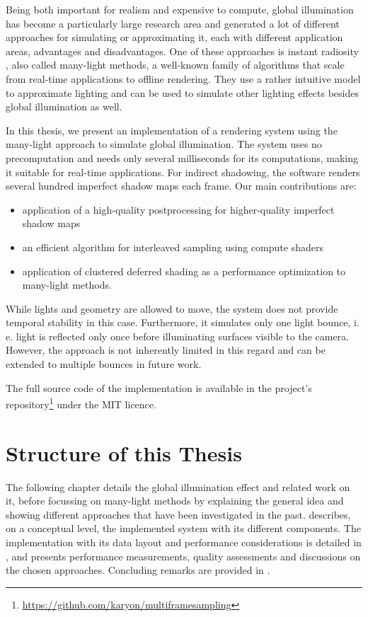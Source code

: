 Being both important for realism and expensive to compute, global illumination has become a particularly large research area and generated a lot of different approaches for simulating or approximating it, each with different application areas, advantages and disadvantages. One of these approaches is instant radiosity \citep{Keller:1997:InstantRadiosity}, also called many-light methods, a well-known family of algorithms that scale from real-time applications to offline rendering. They use a rather intuitive model to approximate lighting and can be used to simulate other lighting effects besides global illumination as well.

In this thesis, we present an implementation of a rendering system using the many-light approach to simulate global illumination. The system uses no precomputation and needs only several milliseconds for its computations, making it suitable for real-time applications. For indirect shadowing, the software renders several hundred imperfect shadow maps \citep{ritschel2008ism} each frame. Our main contributions are:
\begin{itemize}
    \item application of a high-quality postprocessing for higher-quality imperfect shadow maps
    \item an efficient algorithm for interleaved sampling \citep{Keller:2001:InterleavedSampling} using compute shaders
    \item application of clustered deferred shading \citep{olsson2012clustered} as a performance optimization to many-light methods.
\end{itemize}

While lights and geometry are allowed to move, the system does not provide temporal stability in this case. Furthermore, it simulates only one light bounce, i.\,e. light is reflected only once before illuminating surfaces visible to the camera. However, the approach is not inherently limited in this regard and can be extended to multiple bounces in future work.

The full source code of the implementation is available in the project's repository\footnote{\url{https://github.com/karyon/multiframesampling}} under the MIT licence.

\section{Structure of this Thesis}

The following chapter details the global illumination effect and related work on it, before focussing on many-light methods by explaining the general idea and showing different approaches that have been investigated in the past.  describes, on a conceptual level, the implemented system with its different components. The implementation with its data layout and performance considerations is detailed in , and  presents performance measurements, quality assessments and discussions on the chosen approaches. Concluding remarks are provided in .


\cleardoublepage
